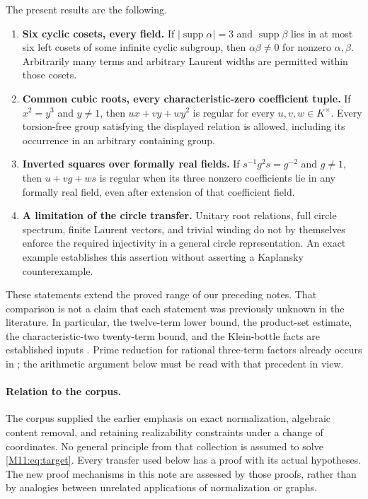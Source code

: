 \documentclass[11pt,a4paper,oneside]{report}
\theoremstyle{definition}
\theoremstyle{remark}
\DeclareMathOperator{\supp}{supp}
\begin{document}
The present results are the following.
\begin{enumerate}
\item \textbf{Six cyclic cosets, every field.}
If $|\supp\alpha|=3$ and $\supp\beta$ lies in at most six left cosets
of some infinite cyclic subgroup, then $\alpha\beta\ne0$ for nonzero
$\alpha,\beta$. Arbitrarily many terms and arbitrary Laurent widths
are permitted within those cosets.
\item \textbf{Common cubic roots, every characteristic-zero
coefficient tuple.} If $x^2=y^3$ and $y\ne1$, then
$ux+vy+wy^2$ is regular for every $u,v,w\in K^\times$.
Every torsion-free group satisfying the displayed relation is allowed,
including its occurrence in an arbitrary containing group.
\item \textbf{Inverted squares over formally real fields.}
If $s^{-1}g^2s=g^{-2}$ and $g\ne1$, then $u+vg+ws$ is regular
when its three nonzero coefficients lie in any formally real field,
even after extension of that coefficient field.
\item \textbf{A limitation of the circle transfer.}
Unitary root relations, full circle spectrum, finite Laurent vectors,
and trivial winding do not by themselves enforce the required
injectivity in a general circle representation. An exact example
establishes this assertion without asserting a Kaplansky counterexample.
\end{enumerate}

These statements extend the proved range of our preceding notes.
That comparison is not a claim that each statement was previously
unknown in the literature. In particular, the twelve-term lower bound,
the product-set estimate, the characteristic-two twenty-term bound,
and the Klein-bottle facts are established inputs
\cite{B:AJ,B:ATsmall,B:AJ4}. Prime reduction for rational three-term factors
already occurs in \cite{B:ATrational}; the arithmetic argument below
must be read with that precedent in view.

\paragraph{Relation to the corpus.}
The corpus \cite{B:Corpus} supplied the earlier emphasis on exact
normalization, algebraic content removal, and retaining realizability
constraints under a change of coordinates. No general principle from
that collection is assumed to solve \eqref{M11:eq:target}. Every transfer
used below has a proof with its actual hypotheses. The new proof
mechanisms in this note are assessed by those proofs, rather than by
analogies between unrelated applications of normalization or graphs.
\end{document}
